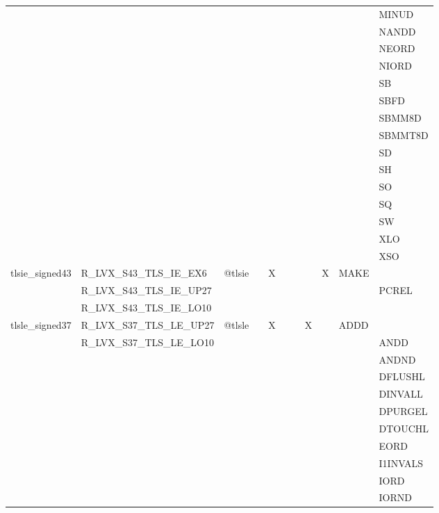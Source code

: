 {\begin{tabular}{|l|l|l|l|l|l|l|l|l|l|l|}
 & & & & & & & & & & \textsf{MINUD} \\
 & & & & & & & & & & \textsf{NANDD} \\
 & & & & & & & & & & \textsf{NEORD} \\
 & & & & & & & & & & \textsf{NIORD} \\
 & & & & & & & & & & \textsf{SB} \\
 & & & & & & & & & & \textsf{SBFD} \\
 & & & & & & & & & & \textsf{SBMM8D} \\
 & & & & & & & & & & \textsf{SBMMT8D} \\
 & & & & & & & & & & \textsf{SD} \\
 & & & & & & & & & & \textsf{SH} \\
 & & & & & & & & & & \textsf{SO} \\
 & & & & & & & & & & \textsf{SQ} \\
 & & & & & & & & & & \textsf{SW} \\
 & & & & & & & & & & \textsf{XLO} \\
 & & & & & & & & & & \textsf{XSO} \\
\hline
\textsf{tlsie\_signed43} & \textsf{R\_LVX\_S43\_TLS\_IE\_EX6} & \textsf{@tlsie} & \textsf{} & \textsf{X} & \textsf{} & \textsf{} & \textsf{} & \textsf{X} & \textsf{MAKE} \\
 & \textsf{R\_LVX\_S43\_TLS\_IE\_UP27} & & & & & & & & & \textsf{PCREL} \\
 & \textsf{R\_LVX\_S43\_TLS\_IE\_LO10} & & & & & & & & & \\
\hline
\textsf{tlsle\_signed37} & \textsf{R\_LVX\_S37\_TLS\_LE\_UP27} & \textsf{@tlsle} & \textsf{} & \textsf{X} & \textsf{} & \textsf{} & \textsf{X} & \textsf{} & \textsf{ADDD} \\
 & \textsf{R\_LVX\_S37\_TLS\_LE\_LO10} & & & & & & & & & \textsf{ANDD} \\
 & & & & & & & & & & \textsf{ANDND} \\
 & & & & & & & & & & \textsf{DFLUSHL} \\
 & & & & & & & & & & \textsf{DINVALL} \\
 & & & & & & & & & & \textsf{DPURGEL} \\
 & & & & & & & & & & \textsf{DTOUCHL} \\
 & & & & & & & & & & \textsf{EORD} \\
 & & & & & & & & & & \textsf{I1INVALS} \\
 & & & & & & & & & & \textsf{IORD} \\
 & & & & & & & & & & \textsf{IORND} \\

\end{tabular}}
